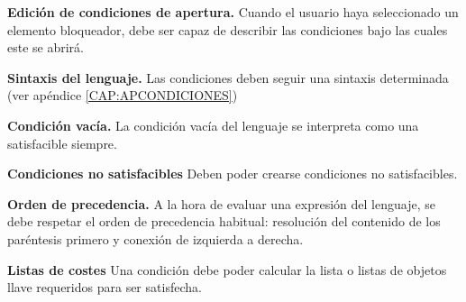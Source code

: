 \item \textbf{Edición de condiciones de apertura.}\newline
	Cuando el usuario haya seleccionado un elemento bloqueador, debe ser capaz de describir las condiciones bajo las cuales este se abrirá.
	\begin{functional}
		\item \textbf{Sintaxis del lenguaje.}\newline
			Las condiciones deben seguir una sintaxis determinada (ver apéndice \ref{CAP:APCONDICIONES})
		\item \textbf{Condición vacía.}\newline
			La condición vacía del lenguaje se interpreta como una satisfacible siempre.
		\item \textbf{Condiciones no satisfacibles}\newline
			Deben poder crearse condiciones no satisfacibles.
		\item \textbf{Orden de precedencia.}\newline
			A la hora de evaluar una expresión del lenguaje, se debe respetar el orden de precedencia habitual: resolución del contenido de los paréntesis primero y conexión de izquierda a derecha.
	\end{functional}
\item \textbf{Listas de costes}\newline
	Una condición debe poder calcular la lista o listas de objetos llave requeridos para ser satisfecha.